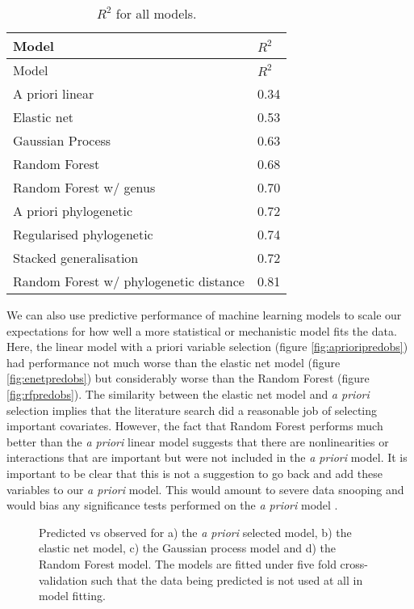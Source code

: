\documentclass[10pt,]{article}
\begin{document}
\begin{table}[t!]
\begin{longtable}[c]{@{}ll@{}}
\caption{\(R^2\) for all models. \label{tbl:allr2}}\tabularnewline
\toprule
Model & \(R^2\)\tabularnewline
\midrule
\endfirsthead
\toprule
Model & \(R^2\)\tabularnewline
\midrule
\endhead
A priori linear & 0.34\tabularnewline
Elastic net & 0.53\tabularnewline
Gaussian Process & 0.63\tabularnewline
Random Forest & 0.68\tabularnewline
Random Forest w/ genus & 0.70\tabularnewline
A priori phylogenetic & 0.72\tabularnewline
Regularised phylogenetic & 0.74\tabularnewline
Stacked generalisation & 0.72\tabularnewline
Random Forest w/ phylogenetic distance & 0.81\tabularnewline
\bottomrule
\end{longtable}
\end{table}

We can also use predictive performance of machine learning models to scale our expectations for how well a more statistical or mechanistic model fits the data. Here, the linear model with a priori variable selection (figure \ref{fig:aprioripredobs}) had performance not much worse than the elastic net model (figure \ref{fig:enetpredobs}) but considerably worse than the Random Forest (figure \ref{fig:rfpredobs}). The similarity between the elastic net model and \emph{a priori} selection implies that the literature search did a reasonable job of selecting important covariates. However, the fact that Random Forest performs much better than the \emph{a priori} linear model suggests that there are nonlinearities or interactions that are important but were not included in the \emph{a priori} model. It is important to be clear that this is not a suggestion to go back and add these variables to our \emph{a priori} model. This would amount to severe data snooping and would bias any significance tests performed on the \emph{a priori} model \citep{snoop}.



\begin{figure}[t!]
  \centering

  \label{fig:predobs}
  \caption{
    Predicted vs observed for a) the \emph{a priori} selected model, b) the elastic net model, c) the Gaussian process model and d) the Random Forest model.
    The models are fitted under five fold cross-validation such that the data being predicted is not used at all in model fitting.
  }
\end{figure}
\end{document}

